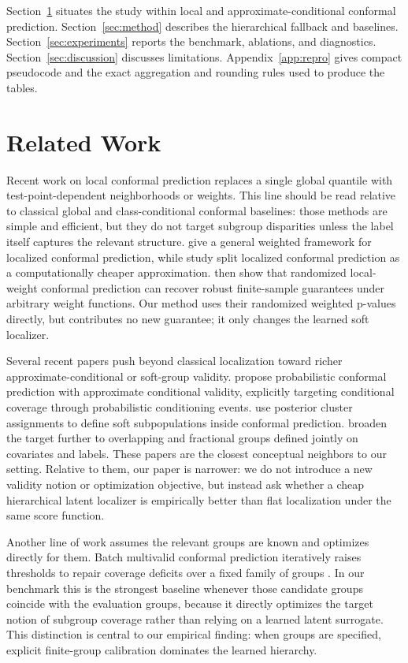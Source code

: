 \documentclass{article}
\begin{document}
Section~\ref{sec:related} situates the study within local and approximate-conditional conformal prediction. Section~\ref{sec:method} describes the hierarchical fallback and baselines. Section~\ref{sec:experiments} reports the benchmark, ablations, and diagnostics. Section~\ref{sec:discussion} discusses limitations. Appendix~\ref{app:repro} gives compact pseudocode and the exact aggregation and rounding rules used to produce the tables.

\section{Related Work}
\label{sec:related}
Recent work on local conformal prediction replaces a single global quantile with test-point-dependent neighborhoods or weights. This line should be read relative to classical global and class-conditional conformal baselines: those methods are simple and efficient, but they do not target subgroup disparities unless the label itself captures the relevant structure. \citet{guan2023localized} give a general weighted framework for localized conformal prediction, while \citet{han2022splitlocalized} study split localized conformal prediction as a computationally cheaper approximation. \citet{hore2025localweights} then show that randomized local-weight conformal prediction can recover robust finite-sample guarantees under arbitrary weight functions. Our method uses their randomized weighted p-values directly, but contributes no new guarantee; it only changes the learned soft localizer.

Several recent papers push beyond classical localization toward richer approximate-conditional or soft-group validity. \citet{plassier2025probabilistic} propose probabilistic conformal prediction with approximate conditional validity, explicitly targeting conditional coverage through probabilistic conditioning events. \citet{zhang2024posterior} use posterior cluster assignments to define soft subpopulations inside conformal prediction. \citet{bairaktari2025kandinsky} broaden the target further to overlapping and fractional groups defined jointly on covariates and labels. These papers are the closest conceptual neighbors to our setting. Relative to them, our paper is narrower: we do not introduce a new validity notion or optimization objective, but instead ask whether a cheap hierarchical latent localizer is empirically better than flat localization under the same score function.

Another line of work assumes the relevant groups are known and optimizes directly for them. Batch multivalid conformal prediction iteratively raises thresholds to repair coverage deficits over a fixed family of groups \citep{jung2022batch}. In our benchmark this is the strongest baseline whenever those candidate groups coincide with the evaluation groups, because it directly optimizes the target notion of subgroup coverage rather than relying on a learned latent surrogate. This distinction is central to our empirical finding: when groups are specified, explicit finite-group calibration dominates the learned hierarchy.
\end{document}
